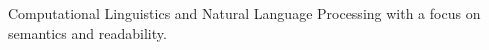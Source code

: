 Computational Linguistics and Natural Language Processing with a focus on semantics and readability.